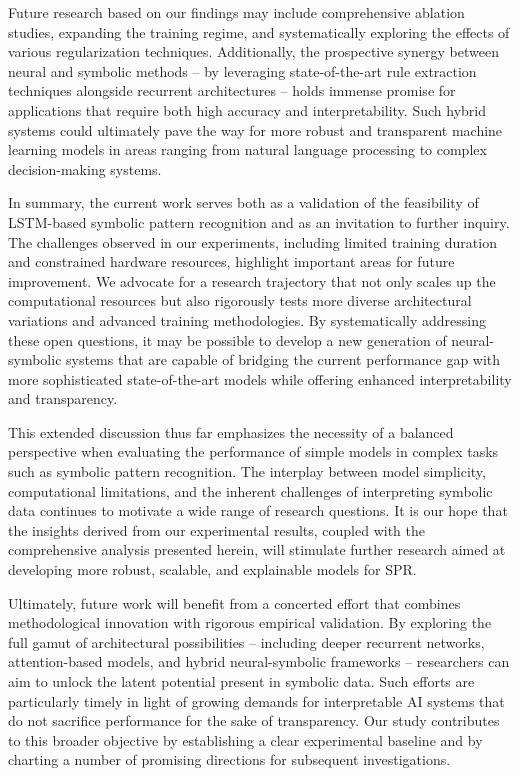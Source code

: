 \documentclass{article}
\begin{document}
Future research based on our findings may include comprehensive ablation studies, expanding the training regime, and systematically exploring the effects of various regularization techniques. Additionally, the prospective synergy between neural and symbolic methods – by leveraging state-of-the-art rule extraction techniques alongside recurrent architectures – holds immense promise for applications that require both high accuracy and interpretability. Such hybrid systems could ultimately pave the way for more robust and transparent machine learning models in areas ranging from natural language processing to complex decision-making systems.

In summary, the current work serves both as a validation of the feasibility of LSTM-based symbolic pattern recognition and as an invitation to further inquiry. The challenges observed in our experiments, including limited training duration and constrained hardware resources, highlight important areas for future improvement. We advocate for a research trajectory that not only scales up the computational resources but also rigorously tests more diverse architectural variations and advanced training methodologies. By systematically addressing these open questions, it may be possible to develop a new generation of neural-symbolic systems that are capable of bridging the current performance gap with more sophisticated state-of-the-art models while offering enhanced interpretability and transparency.

This extended discussion thus far emphasizes the necessity of a balanced perspective when evaluating the performance of simple models in complex tasks such as symbolic pattern recognition. The interplay between model simplicity, computational limitations, and the inherent challenges of interpreting symbolic data continues to motivate a wide range of research questions. It is our hope that the insights derived from our experimental results, coupled with the comprehensive analysis presented herein, will stimulate further research aimed at developing more robust, scalable, and explainable models for SPR.

Ultimately, future work will benefit from a concerted effort that combines methodological innovation with rigorous empirical validation. By exploring the full gamut of architectural possibilities – including deeper recurrent networks, attention-based models, and hybrid neural-symbolic frameworks – researchers can aim to unlock the latent potential present in symbolic data. Such efforts are particularly timely in light of growing demands for interpretable AI systems that do not sacrifice performance for the sake of transparency. Our study contributes to this broader objective by establishing a clear experimental baseline and by charting a number of promising directions for subsequent investigations.
\end{document}
